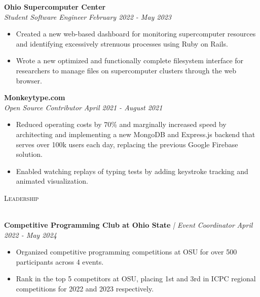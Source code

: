 \documentclass[letterpaper]{article}
\newcommand{\lineunder} {
    \vspace*{-8pt} \\
    \hspace*{-18pt} \hrulefill \\
}
\newcommand{\header} [1] {
    {\hspace*{-18pt}\vspace*{6pt} \textsc{#1}}
    \vspace*{-6pt} \lineunder
}
\begin{document}
    \textbf{Ohio Supercomputer Center}\\
    
    \textit{Student Software Engineer} \hfill \textsl{February 2022 - May 2023}\\
    \vspace{-7pt}
    \begin{itemize} \itemsep -1mm
        
            \item Created a new web-based dashboard for monitoring supercomputer resources and identifying excessively strenuous processes using Ruby on Rails.

            \item Wrote a new optimized and functionally complete filesystem interface for researchers to manage files on supercomputer clusters through the web browser.

    \end{itemize}
    \vspace{-2mm}

    	\textbf{Monkeytype.com}\\
    
    \textit{Open Source Contributor} \hfill \textsl{April 2021 - August 2021}\\
    \vspace{-7pt}
    \begin{itemize} \itemsep -1mm
            \item Reduced operating costs by 70\% and marginally increased speed by architecting and implementing a new MongoDB and Express.js backend that serves over 100k users each day, replacing the previous Google Firebase solution.

            \item Enabled watching replays of typing tests by adding keystroke tracking and animated visualization.

    \end{itemize}
    \vspace{-2mm}

\header{Leadership}
\vspace{1mm}

    \textbf{Competitive Programming Club at Ohio State} \textit{| Event Coordinator} \hfill \textsl{April 2022 - May 2024}\\
    \vspace{-2mm}
    \begin{itemize} \itemsep -1mm
    
        \item Organized competitive programming competitions at OSU for over 500 participants across 4 events.
    
        \item Rank in the top 5 competitors at OSU, placing 1st and 3rd in ICPC regional competitions for 2022 and 2023 respectively.
    
    \end{itemize}
    \vspace{-1mm}
\end{document}
